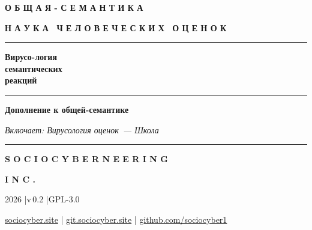 \documentclass[13pt,a4paper]{article}
\begin{document}
\thispagestyle{empty}
\begin{titlepage}
\centering
\vspace*{3cm}

{\montserrat\bfseries\small{}\color{sce-black}
О Б Щ А Я - С Е М А Н Т И К А}

\vspace{0.4em}
{\montserrat\bfseries\footnotesize{}\color{sce-black}
Н А У К А  \ Ч Е Л О В Е Ч Е С К И Х  \ О Ц Е Н О К}

\vspace{1.8em}
\textcolor{sce-gold}{\rule{0.4\textwidth}{0.6pt}}
\vspace{1.2em}

{\montserrat\fontsize{32}{38}\selectfont\bfseries\color{sce-black}
Вирусо-логия\\[0.2em]
семантических\\[0.2em]
реакций}

\vspace{1.4em}
\textcolor{sce-gold}{\rule{0.3\textwidth}{0.4pt}}
\vspace{1.6em}

{\montserrat\bfseries\normalsize{}\color{sce-black}
Дополнение к общей-семантике}

\vspace{0.5em}
{\small\color{sce-black}\itshape
Включает: Вирусология оценок~--- Школа}

\vfill

\textcolor{sce-gold}{\rule{0.5\textwidth}{0.3pt}}
\vspace{0.8em}

{\montserrat\bfseries\small{}\color{sce-black}
S O C I O C Y B E R N E E R I N G}

\vspace{0.2em}
{\montserrat\bfseries\footnotesize{}\color{sce-black}
I N C .}

\vspace{0.6em}
{\small\color{sce-black} 2026 \quad|\quad v\,0.2 \quad|\quad GPL-3.0}

\vspace{0.4em}
{\footnotesize\color{sce-black}
\href{https://sociocyber.site}{sociocyber.site} \quad|\quad
\href{https://git.sociocyber.site}{git.sociocyber.site} \quad|\quad
\href{https://github.com/sociocyber1}{github.com/sociocyber1}}

\end{titlepage}
\end{document}
